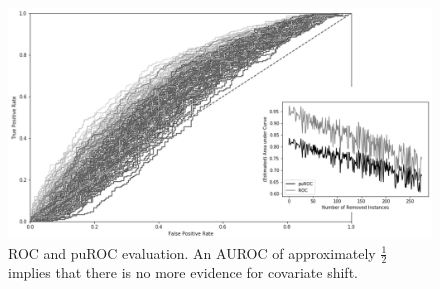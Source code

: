 \begin{figure}[ht]
\centering
   \includegraphics[scale=0.48,angle=0]{fig/res}
\captionsetup{width= 400pt}
\caption{ROC and puROC evaluation. An AUROC of approximately \(\frac{1}{2}\) implies that there is no more evidence for covariate shift.}
   \label{fig:Ng1} 
\end{figure}

